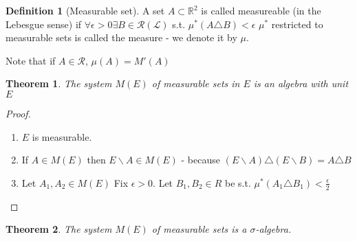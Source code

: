 \documentclass[11pt,a4paper]{report}
\theoremstyle{plain}
\newtheorem{thm}{Theorem}[section]
\theoremstyle{definition}
\newtheorem*{defn}{Definition}
\theoremstyle{remark}
\newcommand{\R}{\mathbb{R}}
\newcommand{\cL}{\mathcal{L}}
\newcommand{\cR}{\mathcal{R}}
\begin{document}
\begin{defn}[Measurable set]
  A set $A \subset \R^2$ is called measureable (in the Lebesgue sense) if $\forall \epsilon > 0 \exists B \in \cR(\cL)$ s.t. $\mu^*(A\triangle B) < \epsilon$ %
  $\mu^*$ restricted to measurable sets is called the measure - we denote it by $\mu$.
\end{defn}
Note that if $A \in \cR$, $\mu(A) = M'(A)$

\begin{thm}
  The system $M(E)$ of measurable sets in $E$ is an algebra with unit $E$
\end{thm}

\begin{proof}\;\
  \begin{enumerate}
    \item $E$ is measurable.
    \item If $A \in M(E)$ then $E \backslash A \in M(E)$ - because $(E\backslash A)\triangle(E\backslash B) = A \triangle B$
    \item Let $A_1, A_2 \in M(E)$ Fix $\epsilon > 0$. Let $B_1, B_2 \in R$ be s.t. $\mu^* (A_1 \triangle B_1) < \frac{\epsilon}{2}$

  \end{enumerate}

\end{proof}

\begin{thm}
  The system $M(E)$ of measurable sets is a $\sigma$-algebra.
\end{thm}

\newcommand{\mustar}{\mu^{*}}
\end{document}
